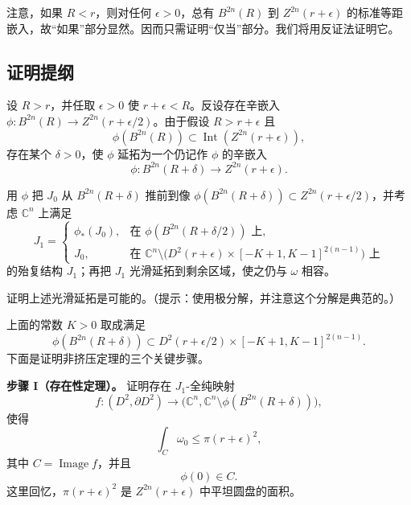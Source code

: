 注意，如果 $R<r$，则对任何 $\epsilon>0$，总有 $B^{2n}(R)$ 到 $Z^{2n}(r+\epsilon)$ 的标准等距嵌入，故“如果”部分显然。因而只需证明“仅当”部分。我们将用反证法证明它。

\subsection{证明提纲}
\label{subsec:non-squeezing-proof-outline}

设 $R>r$，并任取 $\epsilon>0$ 使 $r+\epsilon<R$。反设存在辛嵌入
$\phi:B^{2n}(R)\to Z^{2n}(r+\epsilon/2)$。由于假设 $R>r+\epsilon$ 且
\begin{equation}
 \phi(B^{2n}(R))\subset\operatorname{Int}(Z^{2n}(r+\epsilon)),
 \label{eq:ch11-image-inside-cylinder}
\end{equation}
存在某个 $\delta>0$，使 $\phi$ 延拓为一个仍记作 $\phi$ 的辛嵌入
\[
 \phi:B^{2n}(R+\delta)\longrightarrow Z^{2n}(r+\epsilon).
\]

用 $\phi$ 把 $J_0$ 从 $B^{2n}(R+\delta)$ 推前到像
$\phi(B^{2n}(R+\delta))\subset Z^{2n}(r+\epsilon/2)$，并考虑 $\mathbb C^n$ 上满足
\[
 J_1=
 \begin{cases}
  \phi_*(J_0),&\text{在 }\phi(B^{2n}(R+\delta/2))\text{ 上},\\
  J_0,&\text{在 }\mathbb C^n\setminus
  \bigl(D^2(r+\epsilon)\times[-K+1,K-1]^{2(n-1)}\bigr)\text{ 上}
 \end{cases}
\]
的殆复结构 $J_1$；再把 $J_1$ 光滑延拓到剩余区域，使之仍与 $\omega$ 相容。

\begin{exercise}\label{ex:ch11-smooth-extension-almost-complex}
证明上述光滑延拓是可能的。（提示：使用极分解，并注意这个分解是典范的。）
\end{exercise}

上面的常数 $K>0$ 取成满足
\begin{equation}
 \phi(B^{2n}(R+\delta))
 \subset D^2(r+\epsilon/2)\times[-K+1,K-1]^{2(n-1)}.
 \label{eq:ch11-image-inside-compact-cylinder}
\end{equation}
下面是证明非挤压定理的三个关键步骤。

\medskip
\noindent\textbf{步骤 I（存在性定理）。}
证明存在 $J_1$-全纯映射
\[
 f:(D^2,\partial D^2)\longrightarrow
 \bigl(\mathbb C^n,\mathbb C^n\setminus\phi(B^{2n}(R+\delta))\bigr),
\]
使得
\begin{equation}
 \int_C\omega_0\leq\pi(r+\epsilon)^2,
 \label{eq:ch11-existence-area-bound}
\end{equation}
其中 $C=\operatorname{Image}f$，并且
\begin{equation}
 \phi(0)\in C.
 \label{eq:ch11-curve-through-center-image}
\end{equation}
这里回忆，$\pi(r+\epsilon)^2$ 是 $Z^{2n}(r+\epsilon)$ 中平坦圆盘的面积。

